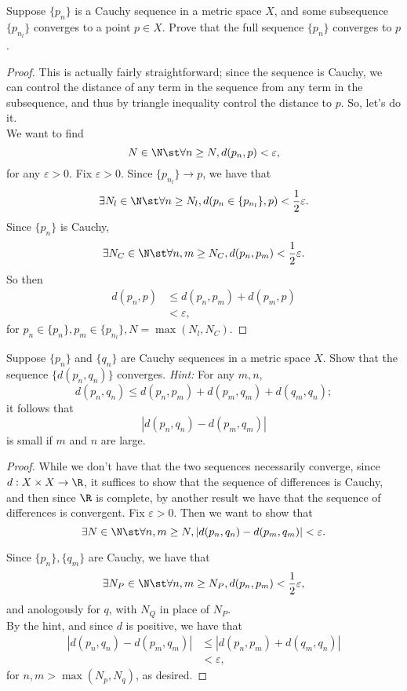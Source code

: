 \documentclass{assignment}
\begin{document}
\begin{question}[3.20*]
  Suppose $\{p_n\}$ is a Cauchy sequence in a metric space $X$, and some subsequence $\{p_{n_l}\}$ 
  converges to a point $p\in X$. Prove that the full sequence $\{p_n\}$ converges to $p$.
\end{question}
\begin{proof}
  This is actually fairly straightforward; since the sequence is Cauchy, we can control the distance 
  of any term in the sequence from any term in the subsequence, and thus by triangle inequality control 
  the distance to $p$. So, let's do it. \\

  We want to find $$N\in\N \st \forall n \geq N, d(p_n, p) < \varepsilon,$$ for any $\varepsilon > 0$.
  Fix $\varepsilon > 0.$ Since $\{p_{n_l}\} \to p$, we have that $$\exists N_l \in \N \st \forall n 
  \geq N_l, d(p_n \in \{p_{n_l}\}, p) < \frac{1}{2}\varepsilon.$$ Since $\{p_n\}$ is Cauchy, 
  $$\exists N_C \in \N \st \forall n,m \geq N_C, d(p_n, p_m) < \frac{1}{2}\varepsilon.$$ So then 
  \begin{align*}
    d(p_n, p) &\leq d(p_n, p_m) + d(p_m, p) \\
              &< \varepsilon,
  \end{align*}
  for $p_n \in \{p_n\}, p_m \in \{p_{n_l}\}, N = \max(N_l, N_C)$.
\end{proof}

\begin{question}[3.23*]
  Suppose $\{p_n\}$ and $\{q_n\}$ are Cauchy sequences in a metric space $X$. Show that the sequence 
  $\{d(p_n, q_n)\}$ converges. \emph{Hint:} For any $m,n$, $$d(p_n, q_n) \leq d(p_n, p_m) + d(p_m, q_m)
    + d(q_m, q_n);$$ it follows that $$|d(p_n, q_n) - d(p_m, q_m)|$$ is small if $m$ and $n$ are large.
\end{question}
\begin{proof}
  While we don't have that the two sequences necessarily converge, since $d: X\times X \to \R$, it 
  suffices to show that the sequence of differences is Cauchy, and then since $\R$ is complete, by 
  another result we have that the sequence of differences is convergent. Fix $\varepsilon > 0$.
  Then we want to show that 
  $$\exists N\in\N \st \forall n,m \geq N, |d(p_n, q_n) - d(p_m, q_m)| < \varepsilon.$$

  Since $\{p_n\}, \{q_m\}$ are Cauchy, we have that 
  $$\exists N_P \in \N \st \forall n,m \geq N_P, d(p_n, p_m) < \frac{1}{2}\varepsilon,$$ 
  and anologously for $q$, with $N_Q$ in place of $N_P$. \\

  By the hint, and since $d$ is positive, we have that 
  \begin{align*}
    |d(p_n, q_n) - d(p_m, q_m)| &\leq |d(p_n, p_m) + d(q_m, q_n)| \\
                                &< \varepsilon,
  \end{align*}
  for $n,m > \max(N_p, N_q)$, as desired.
\end{proof}
\end{document}
